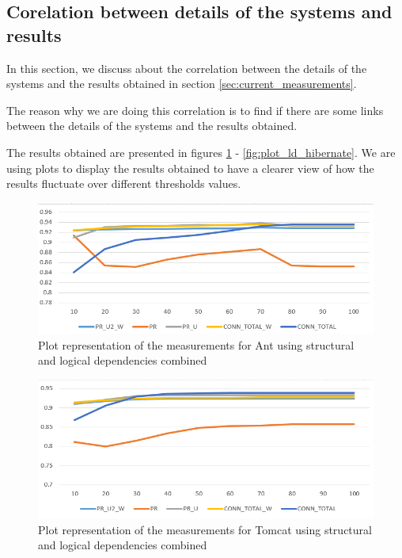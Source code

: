 \documentclass[12pt]{mitthesis}
\begin{document}
\subsection{Corelation between details of the systems and results}
\label{sec:overlapping}

In this section, we discuss about the correlation between the details of the systems and the results obtained in section \ref{sec:current_measurements}.

The reason why we are doing this correlation is to find if there are some links between the details of the systems and the results obtained. 

The results obtained are presented in figures \ref{fig:plot_sd_ld_ant} - \ref{fig:plot_ld_hibernate}. We are using plots to display the results obtained to have a clearer view of how the results fluctuate over different thresholds values.




\begin{figure}[H]
\centering
\includegraphics[width=\textwidth]{ant_SD_LD.PNG}
\caption{ Plot representation of the measurements for Ant using structural and logical dependencies combined }
\label{fig:plot_sd_ld_ant}
\centering
\end{figure}


\begin{figure}[H]
\centering
\includegraphics[width=\textwidth]{tomcat_SD_LD.PNG}
\caption{ Plot representation of the measurements for Tomcat using structural and logical dependencies combined }
\label{fig:plot_sd_ld_tomcat}
\centering
\end{figure}
\end{document}
